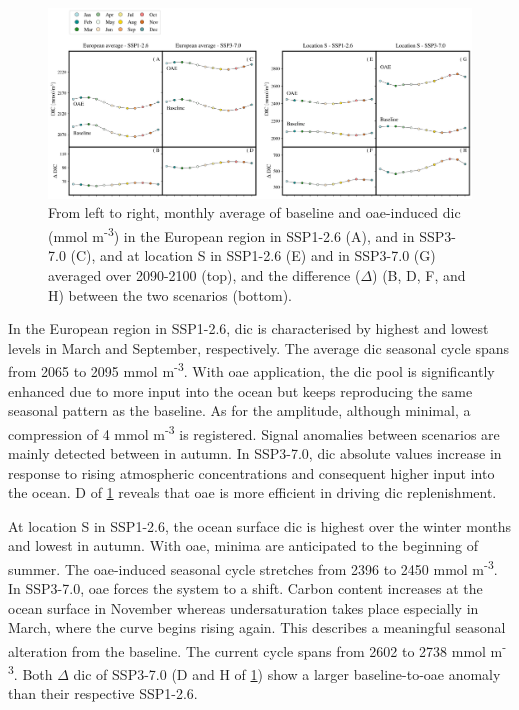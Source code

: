\begin{figure}[H]
\caption[Monthly average of baseline and \texorpdfstring{OAE}{OAE}-induced \texorpdfstring{DIC}{DIC}]{From left to right, monthly average of baseline and \ac{oae}-induced \ac{dic} (mmol m\textsuperscript{-3}) in the European region in SSP1-2.6 (A), and in SSP3-7.0 (C), and at location S in SSP1-2.6 (E) and in SSP3-7.0 (G) averaged over 2090-2100 (top), and the difference ($\Delta$) (B, D, F, and H) between the two scenarios (bottom).}
\label{dic}
\centering
\includegraphics[width=15cm]{fig/3_Results/DIC/dic.png}

\end{figure}

In the European region in SSP1-2.6, \ac{dic} is characterised by highest and lowest levels in March and September, respectively. The average \ac{dic} seasonal cycle spans from 2065 to 2095 mmol m\textsuperscript{-3}. With \ac{oae} application, the \ac{dic} pool is significantly enhanced due to more  input into the ocean but keeps reproducing the same seasonal pattern as the baseline. As for the amplitude, although minimal, a compression of 4 mmol m\textsuperscript{-3} is registered. Signal anomalies between scenarios are mainly detected between in autumn. In SSP3-7.0, \ac{dic} absolute values increase in response to rising atmospheric  concentrations and consequent higher  input into the ocean. D of \cref{dic} reveals that \ac{oae} is more efficient in driving \ac{dic} replenishment. 

At location S in SSP1-2.6, the ocean surface \ac{dic} is highest over the winter months and lowest in autumn. With \ac{oae}, minima are anticipated to the beginning of summer. The \ac{oae}-induced seasonal cycle stretches from 2396 to 2450 mmol m\textsuperscript{-3}. In SSP3-7.0, \ac{oae} forces the system to a shift. Carbon content increases at the ocean surface in November whereas undersaturation takes place especially in March, where the curve begins rising again. This describes a meaningful seasonal alteration from the baseline. The current cycle spans from 2602 to 2738 mmol m\textsuperscript{-3}. Both $\Delta$ \ac{dic} of SSP3-7.0 (D and H of \cref{dic}) show a larger baseline-to-\ac{oae} anomaly than their respective SSP1-2.6.

